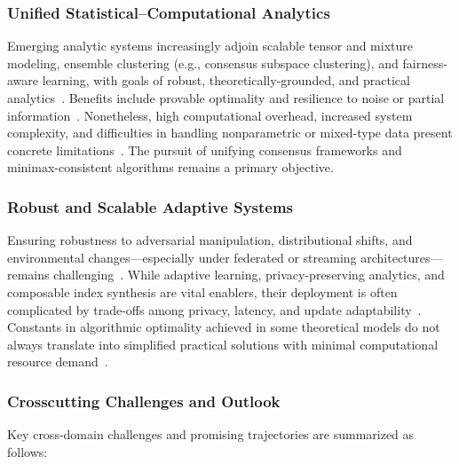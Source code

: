 \documentclass[sigconf]{acmart}
\begin{document}
\subsubsection*{Unified Statistical--Computational Analytics}
Emerging analytic systems increasingly adjoin scalable tensor and mixture modeling, ensemble clustering (e.g., consensus subspace clustering), and fairness-aware learning, with goals of robust, theoretically-grounded, and practical analytics~\cite{ref36,ref110,ref116,ref117,ref118}. Benefits include provable optimality and resilience to noise or partial information~\cite{ref116,ref117}. Nonetheless, high computational overhead, increased system complexity, and difficulties in handling nonparametric or mixed-type data present concrete limitations~\cite{ref110,ref116}. The pursuit of unifying consensus frameworks and minimax-consistent algorithms remains a primary objective.

\subsubsection*{Robust and Scalable Adaptive Systems}
Ensuring robustness to adversarial manipulation, distributional shifts, and environmental changes---especially under federated or streaming architectures---remains challenging~\cite{ref107,ref110,ref117,ref118}. While adaptive learning, privacy-preserving analytics, and composable index synthesis are vital enablers, their deployment is often complicated by trade-offs among privacy, latency, and update adaptability~\cite{ref110,ref117}. Constants in algorithmic optimality achieved in some theoretical models do not always translate into simplified practical solutions with minimal computational resource demand~\cite{ref107,ref118}.

\subsubsection*{Crosscutting Challenges and Outlook}
Key cross-domain challenges and promising trajectories are summarized as follows:
\end{document}
